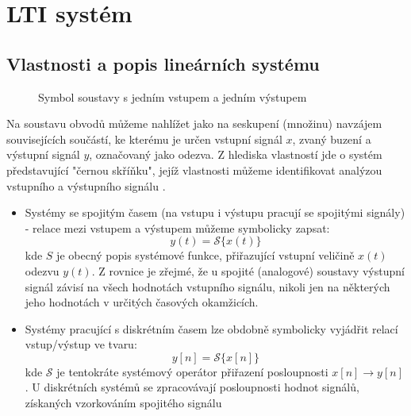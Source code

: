 {
\chapter{LTI systém}
\minitoc
  \section{Vlastnosti a popis lineárních systému}
    \begin{wrapfigure}[8]{r}{5cm}
      \centering      
      
      \caption[Symbol soustavy s jedním vstupem a jedním výstupem]{Symbol soustavy s jedním 
               vstupem a jedním výstupem}
      \label{sas:fig_soustava}   
    \end{wrapfigure}
    Na soustavu obvodů můžeme nahlížet jako na seskupení (množinu) navzájem souvisejících součástí, 
    ke kterému je určen vstupní signál $x$, zvaný buzení a výstupní signál $y$, označovaný jako 
    odezva. Z hlediska vlastností jde o systém představující "černou skříňku", jejíž vlastnosti 
    můžeme identifikovat analýzou vstupního a výstupního signálu \cite{Bicak}.
        
    \begin{itemize}
      \item Systémy se spojitým časem (na vstupu i výstupu pracují se spojitými signály) - relace  
            mezi vstupem a výstupem můžeme symbolicky zapsat:
            \begin{equation}\label{sas:eq_spojity_system}
              y(t)=\mathcal{S}\{x(t)\}
            \end{equation}
            kde $S$ je obecný popis systémové funkce, přiřazující vstupní veličině $x(t)$ odezvu 
            $y(t)$. Z rovnice je zřejmé, že u spojité (analogové) soustavy výstupní signál závisí 
            na všech hodnotách vstupního signálu, nikoli jen na některých jeho hodnotách v určitých 
            časových okamžicích.
      \item Systémy pracující s diskrétním časem lze obdobně symbolicky vyjádřit relací  
            vstup/výstup ve tvaru:
            \begin{equation}\label{sas:eq_dis_system}
              y[n]=\mathcal{S}\{x[n]\}
            \end{equation}
            kde $\mathcal{S}$ je tentokráte systémový operátor přiřazení posloupnosti 
            $x[n]\rightarrow y[n]$. U diskrétních systémů se zpracovávají posloupnosti hodnot 
            signálů, získaných vzorkováním spojitého signálu
    \end{itemize}
    
}
